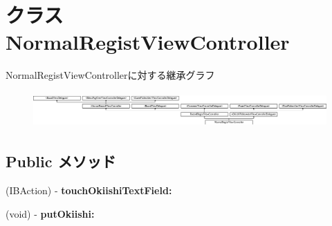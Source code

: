 \hypertarget{interface_normal_regist_view_controller}{
\section{クラス NormalRegistViewController}
\label{interface_normal_regist_view_controller}
}
NormalRegistViewControllerに対する継承グラフ\begin{figure}[H]
\begin{center}
\leavevmode
\includegraphics[height=1.387856cm]{interface_normal_regist_view_controller}
\end{center}
\end{figure}
\subsection*{Public メソッド}
\begin{DoxyCompactItemize}
\item 
\hypertarget{interface_normal_regist_view_controller_a5198c354bf444fb83aefaa35d552f2d3}{
(IBAction) -\/ {\bfseries touchOkiishiTextField:}}
\label{interface_normal_regist_view_controller_a5198c354bf444fb83aefaa35d552f2d3}

\item 
\hypertarget{interface_normal_regist_view_controller_afc43d104bda82e0d7a001a70e8b215b5}{
(void) -\/ {\bfseries putOkiishi:}}
\label{interface_normal_regist_view_controller_afc43d104bda82e0d7a001a70e8b215b5}

\end{DoxyCompactItemize}
